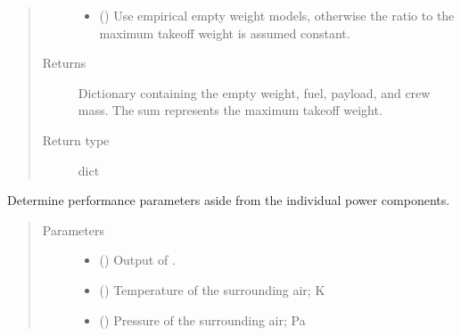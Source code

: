\documentclass[letterpaper,10pt,english]{sphinxmanual}
\begin{document}
\begin{fulllineitems}
\begin{fulllineitems}
\begin{quote}
\begin{description}
\begin{itemize}
\item {} 
\sphinxAtStartPar
{} () \textendash{} Use empirical empty weight models, otherwise the ratio to the
maximum take\sphinxhyphen{}off weight is assumed constant.

\end{itemize}

\item[{Returns}] \leavevmode
\sphinxAtStartPar
Dictionary containing the empty weight, fuel, payload, and crew
mass. The sum represents the maximum take\sphinxhyphen{}off weight.

\item[{Return type}] \leavevmode
\sphinxAtStartPar
dict

\end{description}\end{quote}

\end{fulllineitems}


\begin{fulllineitems}
\label{\detokenize{modules/helicopter:helicopter.Helicopter.performance}}
\sphinxAtStartPar
Determine performance parameters aside from the individual power
components.
\begin{quote}\begin{description}
\item[{Parameters}] \leavevmode\begin{itemize}
\item {} 
\sphinxAtStartPar
{} () \textendash{} Output of {\hyperref[\detokenize{modules/helicopter:helicopter.Helicopter.powers}]{}}.

\item {} 
\sphinxAtStartPar
{} () \textendash{} Temperature of the surrounding air; K

\item {} 
\sphinxAtStartPar
{} () \textendash{} Pressure of the surrounding air; Pa


\end{itemize}
\end{description}
\end{quote}
\end{fulllineitems}
\end{fulllineitems}
\end{document}
